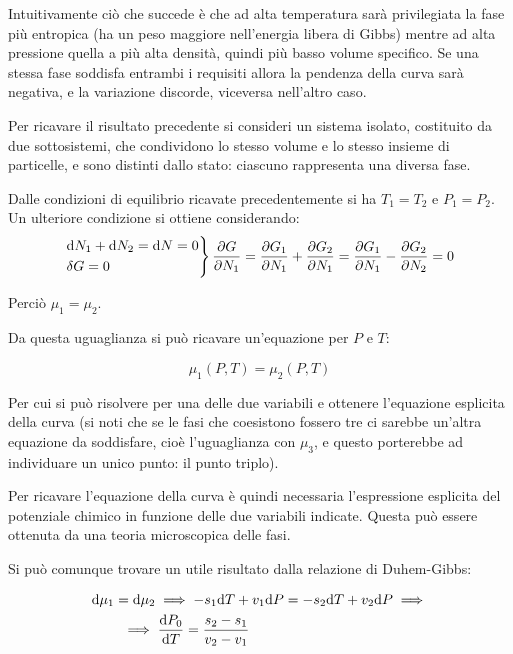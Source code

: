Intuitivamente ciò che succede è che ad alta temperatura sarà privilegiata la fase più entropica (ha un peso maggiore nell'energia libera di Gibbs) mentre ad alta pressione quella a più alta densità, quindi più basso volume specifico. Se una stessa fase soddisfa entrambi i requisiti allora la pendenza della curva sarà negativa, e la variazione discorde, viceversa nell'altro caso. 
\newline

Per ricavare il risultato precedente si consideri un sistema isolato, costituito da due sottosistemi, che condividono lo stesso volume e lo stesso insieme di particelle, e sono distinti dallo stato: ciascuno rappresenta una diversa fase.

Dalle condizioni di equilibrio ricavate precedentemente si ha $T_1 = T_2$ e $P_1 = P_2$. Un ulteriore condizione si ottiene considerando:
\begin{align*}
\begin{rcases*}
\dd N_1 + \dd N_2 = \dd N = 0\\
\delta G = 0
\end{rcases*}
\frac{\partial G}{\partial N_1} = \frac{\partial G_1}{\partial N_1} + \frac{\partial G_2}{\partial N_1} = \frac{\partial G_1}{\partial N_1} - \frac{\partial G_2}{\partial N_2} = 0
\end{align*}

\noindent Perciò $\mu_1 = \mu_2$.

Da questa uguaglianza si può ricavare un'equazione per $P$ e $T$:

\begin{equation*}
\mu_1 (P,T) = \mu_2 (P,T)
\end{equation*}

Per cui si può risolvere per una delle due variabili e ottenere l'equazione esplicita della curva (si noti che se le fasi che coesistono fossero tre ci sarebbe un'altra equazione da soddisfare, cioè l'uguaglianza con $\mu_3$, e questo porterebbe ad individuare un unico punto: il punto triplo).

Per ricavare l'equazione della curva è quindi necessaria l'espressione esplicita del potenziale chimico in funzione delle due variabili indicate. Questa può essere ottenuta da una teoria microscopica delle fasi.

Si può comunque trovare un utile risultato dalla relazione di Duhem-Gibbs:

\begin{align*}
&\dd \mu_1 = \dd \mu_2 \implies -s_1 \dd T + v_1 \dd P = -s_2 \dd T + v_2 \dd P \implies \\
&\qquad \implies \derivative{ P_0}{T} = \frac{s_2 - s_1}{v_2 - v_1}
\end{align*}

